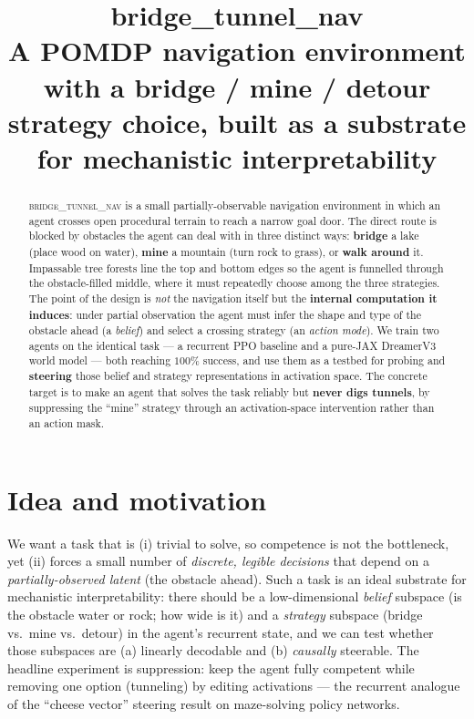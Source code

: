 \documentclass[11pt]{article}
\title{\textbf{bridge\_tunnel\_nav}\\[2pt]
\large A POMDP navigation environment with a bridge / mine / detour
strategy choice, built as a substrate for mechanistic interpretability}
\author{}
\date{}
\begin{document}
\maketitle
\vspace{-2.2em}

\begin{abstract}\noindent
\textsc{bridge\_tunnel\_nav} is a small partially-observable navigation environment in
which an agent crosses open procedural terrain to reach a narrow goal door. The
direct route is blocked by obstacles the agent can deal with in three distinct
ways: \textbf{bridge} a lake (place wood on water), \textbf{mine} a mountain
(turn rock to grass), or \textbf{walk around} it. Impassable tree forests line
the top and bottom edges so the agent is funnelled through the obstacle-filled
middle, where it must repeatedly choose among the three strategies. The point of
the design is \emph{not} the navigation itself but the \textbf{internal computation
it induces}: under partial observation the agent must infer the shape and type of
the obstacle ahead (a \emph{belief}) and select a crossing strategy (an
\emph{action mode}). We train two agents on the identical task --- a recurrent PPO
baseline and a pure-JAX DreamerV3 world model --- both reaching $100\%$ success,
and use them as a testbed for probing and \textbf{steering} those belief and
strategy representations in activation space. The concrete target is to make an
agent that solves the task reliably but \textbf{never digs tunnels}, by
suppressing the ``mine'' strategy through an activation-space intervention rather
than an action mask.
\end{abstract}

\section{Idea and motivation}

We want a task that is (i) trivial to solve, so competence is not the bottleneck,
yet (ii) forces a small number of \emph{discrete, legible decisions} that depend
on a \emph{partially-observed latent} (the obstacle ahead). Such a task is an
ideal substrate for mechanistic interpretability: there should be a low-dimensional
\emph{belief} subspace (is the obstacle water or rock; how wide is it) and a
\emph{strategy} subspace (bridge vs.\ mine vs.\ detour) in the agent's recurrent
state, and we can test whether those subspaces are (a) linearly decodable and
(b) \emph{causally} steerable. The headline experiment is suppression: keep the
agent fully competent while removing one option (tunneling) by editing activations
--- the recurrent analogue of the ``cheese vector'' steering result on maze-solving
policy networks.
\end{document}
